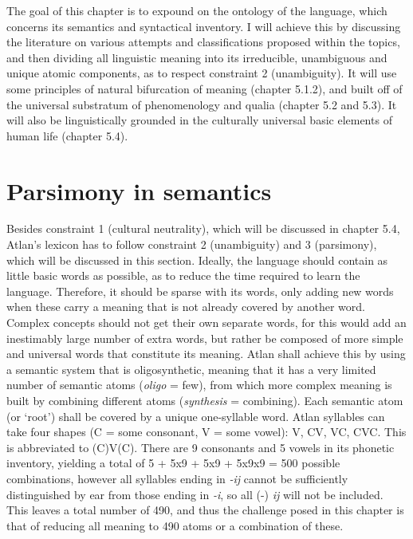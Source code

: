 
The goal of this chapter is to expound on the ontology of the language, which concerns its semantics and syntactical inventory. I will achieve this by discussing the literature on various attempts and classifications proposed within the topics, and then dividing all linguistic meaning into its irreducible, unambiguous and unique atomic components, as to respect constraint 2 (unambiguity). It will use some principles of natural bifurcation of meaning (chapter 5.1.2), and built off of the universal substratum of phenomenology and qualia (chapter 5.2 and 5.3). It will also be linguistically grounded in the culturally universal basic elements of human life (chapter 5.4).


\section{Parsimony in semantics}



Besides constraint 1 (cultural neutrality), which will be discussed in chapter 5.4, Atlan’s lexicon has to follow constraint 2 (unambiguity) and 3 (parsimony), which will be discussed in this section. Ideally, the language should contain as little basic words as possible, as to reduce the time required to learn the language. Therefore, it should be sparse with its words, only adding new words when these carry a meaning that is not already covered by another word. Complex concepts should not get their own separate words, for this would add an inestimably large number of extra words, but rather be composed of more simple and universal words that constitute its meaning. Atlan shall achieve this by using a semantic system that is oligosynthetic, meaning that it has a very limited number of semantic atoms (\textit{oligo}  = few), from which more complex meaning is built by combining different atoms (\textit{synthesis}  = combining). Each semantic atom (or ‘root’) shall be covered by a unique one-syllable word. Atlan syllables can take four shapes (C = some consonant, V = some vowel): V, CV, VC, CVC. This is abbreviated to (C)V(C). There are 9 consonants and 5 vowels in its phonetic inventory, yielding a total of 5 + 5x9 + 5x9 + 5x9x9 = 500 possible combinations, however all syllables ending in \textit{-ij} cannot be sufficiently distinguished by ear from those ending in \textit{-i}, so all (-) \textit{ij} will not be included. This leaves a total number of 490, and thus the challenge posed in this chapter is that of reducing all meaning to 490 atoms or a combination of these.  

